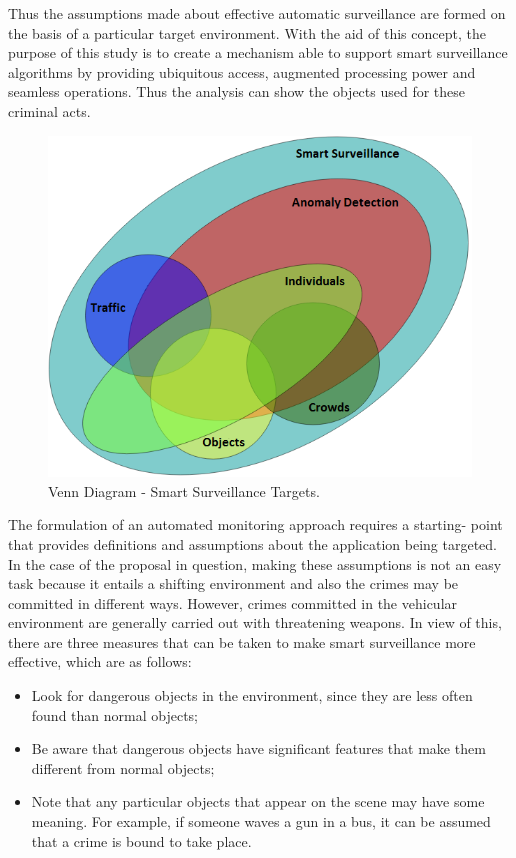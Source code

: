 Thus the assumptions made about effective automatic surveillance are formed on the basis of a particular target environment. With the aid of this concept, the purpose of this study is to create a mechanism able to support smart surveillance algorithms by providing ubiquitous access, augmented processing power and seamless operations. Thus the analysis can show the objects used for these criminal acts.


\begin{figure}[htb!]
  \centering
    \includegraphics[scale=0.50]{Imagens/cap2_diagram.png}
    \caption{Venn Diagram - Smart Surveillance Targets.}
    \label{fig:targets}
\end{figure}

The formulation of an automated monitoring approach requires a starting- point that provides definitions and assumptions about the application being targeted. In the case of the proposal in question, making these assumptions is not an easy task because it entails a shifting environment and also the crimes may be committed in different ways. However, crimes committed in the vehicular environment are generally carried out with threatening weapons. In view of this, there are three measures that can be taken to make smart surveillance more effective, which are as follows: 

\begin{itemize}
\item Look for  dangerous objects in the environment, since they  are  less often found  than normal objects;
\item Be aware that  dangerous objects have significant features that make them  different  from normal objects;
\item Note that any particular objects that  appear on the scene may have some meaning. For example, if someone waves a gun in a bus, it can be assumed that a crime is bound to take place.
\end{itemize}

